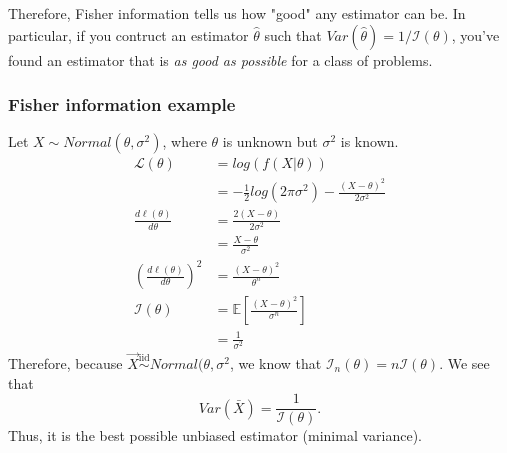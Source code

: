 \documentclass[titlepage, 12pt, leqno]{article}
\begin{document}
Therefore, Fisher information tells us how "good" any estimator can be. In
particular, if you contruct an estimator $\hat \theta$ such that
 $Var(\hat \theta) = 1 / \mathcal{I}(\theta)$, you've found an estimator that
 is \textit{as good as possible} for a class of problems.

\subsubsection{Fisher information example}
Let $X \sim Normal(\theta, \sigma^{2})$, where $\theta$ is unknown but
 $\sigma^{2}$ is known.
\begin{align*}
    \mathcal{L}(\theta) &= log(f(X|\theta)) \\
        &= - \frac{1}{2}log(2\pi\sigma^{2}) - \frac{(X-\theta)^{2}}{2\sigma^{2}}
        \\
    \frac{d \ell(\theta)}{d \theta} &= \frac{2(X-\theta)}{2\sigma^{2}} \\
                                    &= \frac{X-\theta}{\sigma^{2}} \\
    \left(\frac{d \ell(\theta)}{d \theta}\right)^{2} &= 
    \frac{(X-\theta)^{2}}{\theta^{n}} \\
    \mathcal{I}(\theta) &= \mathbb{E}\left[\frac{(X-\theta)^{2}}{\sigma^{n}} 
    \right]\\
                        &= \frac{1}{\sigma^{2}}
\end{align*}
Therefore, because $\vec X \overset{\mathrm{iid}}{\sim} 
Normal(\theta, \sigma^{2}$, we know that $\mathcal{I}_{n}(\theta) =
n\mathcal{I}(\theta)$. We see that
\[
Var(\bar X) = \frac{1}{\mathcal{I}(\theta)}.
\]
Thus, it is the best possible unbiased estimator (minimal variance).
\end{document}
